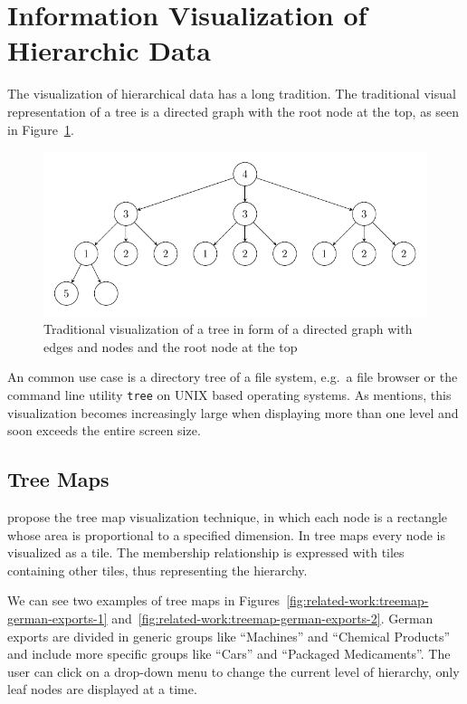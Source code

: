 \section{Information Visualization of Hierarchic Data}
The visualization of hierarchical data has a long tradition.
The traditional visual representation of a tree is a directed graph with the root node at the top, as seen in Figure~\ref{fig:related-work:tree-graph}.
\begin{figure}[ht]
	\centering
	\includegraphics[width=\textwidth]{figures/related-work/tree.pdf}
	\caption{Traditional visualization of a tree in form of a directed graph with edges and nodes and the root node at the top}\label{fig:related-work:tree-graph}
\end{figure}
An common use case is a directory tree of a file system, e.g.\ a file browser or the command line utility \texttt{tree} on UNIX based operating systems.
As \textcite{Shneiderman1992} mentions, this visualization becomes increasingly large when displaying more than one level and soon exceeds the entire screen size.

\subsection{Tree Maps}
\textcite{Johnson1991} propose the tree map visualization technique, in which each node is a rectangle whose area is proportional to a specified dimension.
In tree maps every node is visualized as a tile.
The membership relationship is expressed with tiles containing other tiles, thus representing the hierarchy.

We can see two examples of tree maps in Figures~\ref{fig:related-work:treemap-german-exports-1} and~\ref{fig:related-work:treemap-german-exports-2}.
German exports are divided in generic groups like ``Machines'' and ``Chemical Products'' and include more specific groups like ``Cars'' and ``Packaged Medicaments''.
The user can click on a drop-down menu to change the current level of hierarchy, only leaf nodes are displayed at a time.

